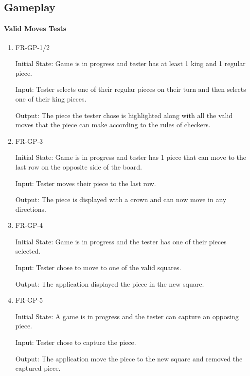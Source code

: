 \documentclass[12pt, titlepage]{article}
\begin{document}
\subsection{Gameplay}

\paragraph{Valid Moves Tests}
\begin{enumerate}
    \item{FR-GP-1/2}
    \label{FR-GP-1/2}    
                    
    Initial State: Game is in progress and tester has at least 1 king and 1 regular piece.
    
    Input: Tester selects one of their regular pieces on their turn and then selects one of their king pieces.
    
    Output: The piece the tester chose is highlighted along with all the valid moves that the piece can make according to the rules of checkers.
    \item{FR-GP-3}
     \label{FR-GP-3}    
                       
    Initial State: Game is in progress and tester has 1 piece that can move to the last row on the opposite side of the board.
    
    Input: Tester moves their piece to the last row.
    
    Output: The piece is displayed with a crown and can now move in any directions.
    \item{FR-GP-4}
    \label{FR-GP-4}    
                        
    Initial State: Game is in progress and the tester has one of their pieces selected.
    
    Input: Tester chose to move to one of the valid squares.
    
    Output: The application displayed the piece in the new square.
    \item{FR-GP-5}
     \label{FR-GP-5}    
                       
    Initial State: A game is in progress and the tester can capture an opposing piece.
    
    Input: Tester chose to capture the piece.
    
    Output: The application move the piece to the new square and removed the captured piece.
\end{enumerate}
\end{document}
